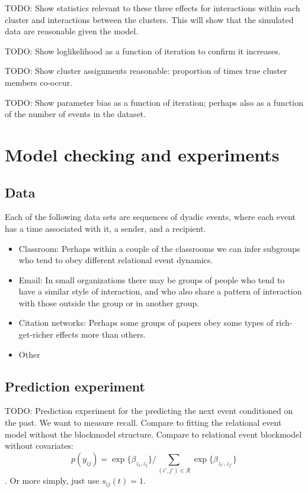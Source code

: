 \documentclass[11pt]{article}
\begin{document}
TODO: Show statistics relevant to these three effects for interactions within each cluster and interactions between the clusters.  This will show that the simulated data are reasonable given the model.

TODO: Show loglikelihood as a function of iteration to confirm it increases.

TODO: Show cluster assignments reasonable: proportion of times true cluster members co-occur.

TODO: Show parameter bias as a function of iteration; perhaps also as a function of the number of events in the dataset.

\section{Model checking and experiments}

\subsection*{Data}

Each of the following data sets are sequences of dyadic events, where each event has a time associated with it, a sender, and a recipient.

\begin{itemize}
\item Classroom:  Perhaps within a couple of the classrooms we can infer subgroups who tend to obey different relational event dynamics.
\item Email: In small organizations there may be groups of people who tend to have a similar style of interaction, and who also share a pattern of interaction with those outside the group or in another group.
\item Citation networks: Perhaps some groups of papers obey some types of rich-get-richer effects more than others.
\item Other
\end{itemize}

\subsection*{Prediction experiment}
TODO: Prediction experiment for the predicting the next event conditioned on the past.  We want to measure recall.  Compare to fitting the relational event model without the blockmodel structure.  Compare to relational event blockmodel without covariates: $$p(y_{ij}) = \exp\{\beta_{z_i,z_j}\} / \sum_{(i',j') \in \mathcal{R}}\exp\{\beta_{z_{i'},z_{j'}}\} $$.
Or more simply, just use $s_{ij}(t) = 1$.
\end{document}
